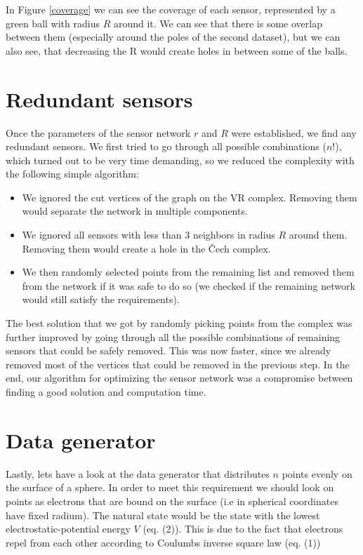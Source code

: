 \documentclass[a4paper, 12pt]{article}
\begin{document}
In Figure \ref{coverage} we can see the coverage of each sensor, represented by a green ball with radius $R$ around it. We can see that there is some overlap between them (especially around the poles of the second dataset), but we can also see, that decreasing the R would create holes in between some of the balls.


\section{Redundant sensors}
Once the parameters of the sensor network $r$ and $R$ were established, we find any redundant sensors. We first tried to go through all possible combinations ($n!$), which turned out to be very time demanding, so we reduced the complexity with the following simple algorithm:
\begin{itemize}
	\item We ignored the cut vertices of the graph on the VR complex. Removing them would separate the network in multiple components.
	\item We ignored all sensors with less than 3 neighbors in radius $R$ around them. Removing them would create a hole in the Čech complex.
	\item We then randomly selected points from the remaining list and removed them from the network if it was safe to do so (we checked if the remaining network would still satisfy the requirements).
\end{itemize}

The best solution that we got by randomly picking points from the complex was further improved by going through all the possible combinations of remaining sensors that could be safely removed. This was now faster, since we already removed most of the vertices that could be removed in the previous step. In the end, our algorithm for optimizing the sensor network was a compromise between finding a good solution and computation time.


\section{Data generator}
Lastly, lets have a look at the data generator that distributes $n$ points evenly on the surface of a sphere. In order to meet this requirement we should look on points as electrons that are bound on the surface (i.e in spherical coordinates have fixed radium). The natural state would be the state with the lowest electrostatic-potential energy $V$ (eq. (2)). This is due to the fact that electrons repel from each other according to Coulumbs inverse square law (eq. (1))
\end{document}
